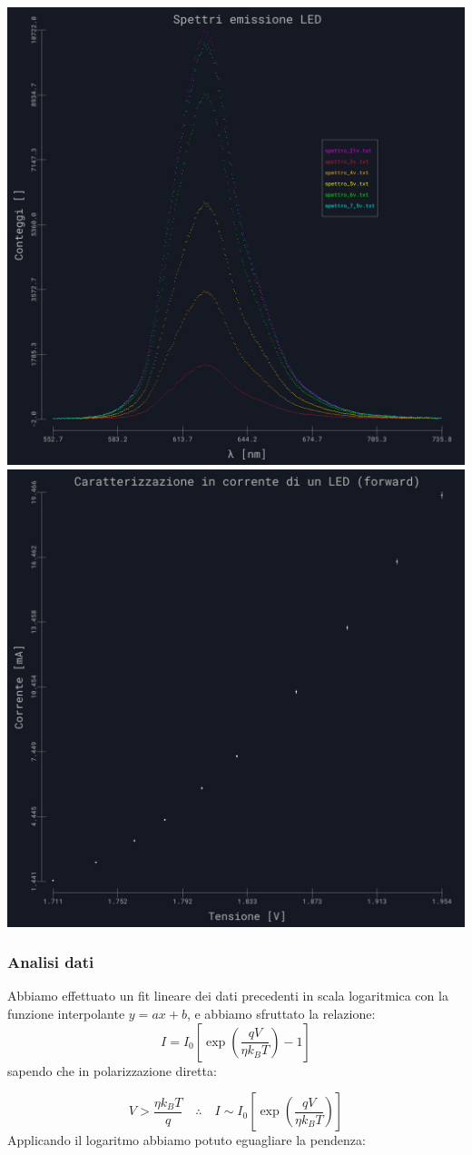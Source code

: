 \documentclass{article}
\begin{document}
\begin{center}
    \includegraphics[width=.45\textwidth]{../images/grafico5.png}
    \hfill
    \includegraphics[width=.45\textwidth]{../images/grafico6.png}
    \label{grafico:9/10}
\end{center}

\subsubsection{Analisi dati}
Abbiamo effettuato un fit lineare dei dati precedenti in scala logaritmica con la funzione interpolante $y=ax+b$, e abbiamo sfruttato la relazione: 
$$I=I_0 \left[\exp\left(\frac{qV}{\eta k_B T}\right)-1\right]$$ 
\newline
sapendo che in polarizzazione diretta:

$$V>\frac{\eta k_B T}{q} \quad \therefore \quad I \sim I_0 \left[\exp\left(\frac{qV}{\eta k_B T}\right) \right]$$
\newline
Applicando il logaritmo abbiamo potuto eguagliare la pendenza:
\end{document}

